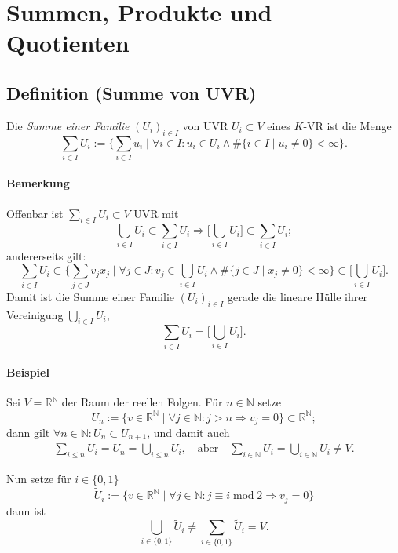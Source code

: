\section{Summen, Produkte und Quotienten}
\subsection{Definition (Summe von UVR)}
	\begin{Definition}
		Die \emph{Summe einer Familie} $ (U_i)_{i\in I} $ von UVR $ U_i\subset V $ eines $ K $-VR ist die Menge
		\[
		\sum_{i\in I} U_i := \Big\{\sum_{i \in I}u_i\mid \forall i\in I: u_i\in U_i \land \# \{i\in I\mid u_i \neq 0\}<\infty\Big\}.
		\]
	\end{Definition}
		
\paragraph{Bemerkung}
	Offenbar ist $ \sum_{i\in I} U_i\subset V $ UVR mit
	\[  \bigcup_{i\in I}U_i \subset \sum_{i\in I} U_i \Rightarrow \Big[\bigcup_{i\in I}U_i\Big]\subset \sum_{i\in I} U_i; \]
	andererseits gilt:
	\[ \sum_{i\in I}U_i \subset \Big\{\sum_{j\in J}v_jx_j\mid \forall j\in J: v_j\in \bigcup_{i\in I}U_i \land \#\{j\in J\mid x_j\neq 0\}<\infty\Big\}\subset \Big[\bigcup_{i\in I}U_i\Big]. \]
	Damit ist die Summe einer Familie $ (U_i)_{i\in I} $ gerade die lineare Hülle ihrer Vereinigung $ \bigcup_{i\in I}U_i $,
	\[ \sum_{i\in I}U_i= \Big[\bigcup_{i\in I}U_i\Big]. \]
		
\paragraph{Beispiel}
	Sei $ V=\mathbb{R}^\mathbb{N} $ der Raum der reellen Folgen. Für $ n\in \mathbb{N} $ setze
		\[
		U_n := \{v\in \mathbb{R}^\mathbb{N}\mid \forall j\in \mathbb{N}: j>n\Rightarrow v_j = 0 \} \subset \mathbb{R}^\mathbb{N};
		\]
	dann gilt $ \forall n\in \mathbb{N}: U_n\subset U_{n+1} $, und damit auch
		\begin{gather*}
		\sum_{i\leq n} U_i = U_n = \bigcup_{i\leq n}U_i, \quad\text{aber}\quad \sum_{i\in \mathbb{N}}U_i = \bigcup_{i\in \mathbb{N}}U_i \neq V.
		\end{gather*}
		
	Nun setze für $ i\in \{0,1\} $
		\[
		\tilde{U}_i := \{v\in \mathbb{R}^\mathbb{N}\mid \forall j\in \mathbb{N}: j\equiv
i\operatorname{mod} 2\Rightarrow v_j = 0\}
		\]
	dann ist 
		\[
		\bigcup_{i\in \{0,1\}}\tilde{U}_i \neq \sum_{i\in \{0,1\}}\tilde{U}_i = V.
		\]
		
